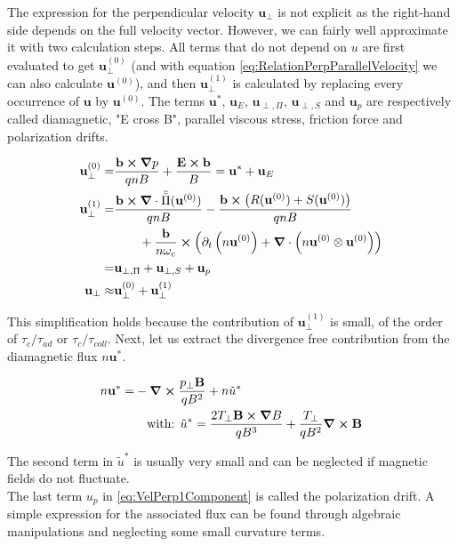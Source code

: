 The expression for the perpendicular velocity $\mathbf{u}_\perp$ is not explicit as the right-hand side depends on the full velocity vector. However, we can fairly well approximate it with two calculation steps. All terms that do not depend on $u$ are first evaluated to get $\mathbf{u}_\perp^{(0)}$ (and with equation \ref{eq:RelationPerpParallelVelocity} we can also calculate $\mathbf{u}^{(0)}$), and then $\mathbf{u}_\perp^{(1)}$ is calculated by replacing every occurrence of $\mathbf{u}$ by $\mathbf{u}^{(0)}$. The terms $\mathbf{u}^*$, $\mathbf{u}_E$, $\mathbf{u}_{\perp,\Pi}$, $\mathbf{u}_{\perp,S}$ and $\mathbf{u}_{p}$ are respectively called diamagnetic, "E cross B", parallel viscous stress, friction force and polarization drifts.

\begin{align}
	\mathbf{u}_\perp^{(0)} =& \frac{\mathbf{b}\cross\grad p}{qnB} + \frac{\mathbf{E}\cross\mathbf{b}}{B} = \mathbf{u}^* + \mathbf{u}_E \label{eq:VelPerp0Component} \\	
	\mathbf{u}_\perp^{(1)} =& \frac{\mathbf{b}\cross\grad\cdot\bar{\bar{\Pi}}(\mathbf{u}^{(0)})}{qnB} - \frac{\mathbf{b}\cross\left(R(\mathbf{u}^{(0)})+S(\mathbf{u}^{(0)})\right)}{qnB} \nonumber\\ & \qquad + \frac{\mathbf{b}}{n\omega_c} \cross \left(\partial_t \left(n\mathbf{u}^{(0)}\right) + \grad\cdot\left(n\mathbf{u}^{(0)}\otimes\mathbf{u}^{(0)}\right)\right) \nonumber \\
	=& \mathbf{u}_{\perp,\Pi} + \mathbf{u}_{\perp,S} + \mathbf{u}_{p} \label{eq:VelPerp1Component} \\
	\mathbf{u}_\perp \approx& \mathbf{u}_\perp^{(0)} + \mathbf{u}_\perp^{(1)}
\end{align}

This simplification holds because the contribution of $\mathbf{u}_\perp^{(1)}$ is small, of the order of $\tau_c / \tau_{ad}$ or $\tau_c / \tau_{coll}$. Next, let us extract the divergence free contribution from the diamagnetic flux $n\mathbf{u}^*$.

\begin{align}
	\label{eq:definitionDiamagneticDrift}
	n\mathbf{u}^* =& -\grad \cross \frac{p_\perp\mathbf{B}}{qB^2} + n\tilde{u}^* \nonumber\\
	& \quad\text{with: } \tilde{u}^* = \frac{2T_\perp\mathbf{B}\cross\grad B}{qB^3} + \frac{T_\perp}{qB^2}\grad\cross\mathbf{B}
\end{align}

The second term in $\tilde{u}^*$ is usually very small and can be neglected if magnetic fields do not fluctuate. \\
The last term $u_{p}$ in \autoref{eq:VelPerp1Component} is called the polarization drift. A simple expression for the associated flux can be found through algebraic manipulations and neglecting some small curvature terms.

